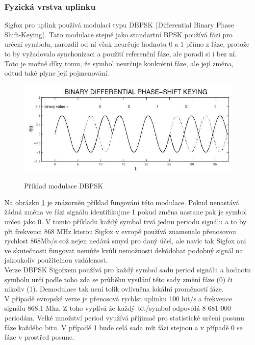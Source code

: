 \documentclass{ctuthesis}
\begin{document}
\subsubsection{Fyzická vrstva uplinku}
Sigfox pro uplink používá modulaci typu DBPSK (Differential Binary Phase Shift-Keying). Tato modulace stejně jako standartní BPSK používá fázi pro určení symbolu, narozdíl od ní však neurčuje hodnotu 0 a 1 přímo z fáze, protože to by vyžadovalo synchonizaci a použití referenční fáze, ale poradí si i bez ní. Toto je možné díky tomu, že symbol neurčuje konkrétní fáze, ale její změna, odtud také plyne její pojmenování. \\
\begin{figure}
\caption{Příklad modulace DBPSK \cite{dbpsk}}
\includegraphics[width=1\textwidth]{./images/dbpsk.jpg}
\label{dbpsk}
\end{figure}
Na obrázku \ref{dbpsk} je znázorněn příklad fungování této modulace. Pokud nenastává žádná změna ve fázi signálu identifikujme 1 pokud změna nastane pak je symbol určen jako 0. V tomto příkladu každý symbol trvá jednu periodu signálu a to by při frekvenci 868 MHz kterou Sigfox v evropě používá znamenalo přenosovou rychlost 868Mb/s což nejen nedává smysl pro daný účel, ale navíc tak Sigfox ani ve skutečnosti fungovat nemůže kvůli nemožnosti dekódobat podobný signál na jakoukoliv použitelnou vzdálenost.\\
Verze DBPSK Sigofxem používá pro každý symbol sadu period signálu a hodnotu symbolu určí podle toho zda se průběhu vysílání této sady změní fáze (0) či nikoliv (1). Demodulace tak není tolik ovlivněna lokální proměností fáze.\\
V případě evropské verze je přenosová rychlst uplinku 100 bit/s a frekvence signálu 868,1 Mhz. Z toho vyplívá že každý bit/symbol odpovídá 8 681 000 periodám. Velké množství period využívá příjimač pro statistické určení posunu fáze každého bitu. V případě 1 bude celá sada mít fázi stejnou a v případě 0 se fáze v prostřed posune. \\
\end{document}
